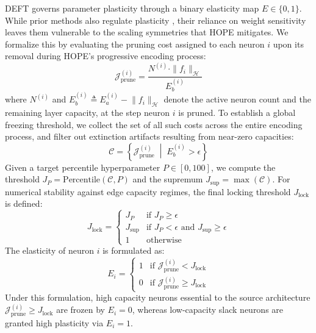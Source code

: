 \documentclass[11pt, a4paper, copyright, gdm]{google}
\newcommand{\normshort}[1]{\lVert#1\rVert}
\newcommand{\calC}{\mathcal{C}}
\newcommand{\calH}{\mathcal{H}}
\newcommand{\calJ}{\mathcal{J}}
\theoremstyle{definition}
\begin{document}
DEFT governs parameter plasticity through a binary elasticity map $E \in \{0,1\}$. While prior methods also regulate plasticity \cite{zhou2024taco}, their reliance on weight sensitivity leaves them vulnerable to the scaling symmetries that HOPE mitigates. We formalize this by evaluating the pruning cost assigned to each neuron $i$ upon its removal during HOPE's progressive encoding process:
\begin{equation}
    \calJ_{\text{prune}}^{(i)} = \frac{N^{(i)} \cdot \|f_i\|_{\calH}}{E_b^{(i)}}
\end{equation}
where $N^{(i)}$ and $E_b^{(i)} \triangleq E_a^{(i)} - \normshort{f_i}_{\calH}$ denote the active neuron count and the remaining layer capacity, at the step neuron $i$ is pruned. To establish a global freezing threshold, we collect the set of all such costs across the entire encoding process, and filter out extinction artifacts resulting from near-zero capacities:
\begin{equation}
    \calC = \left\{ \calJ_{\text{prune}}^{(i)} \;\middle|\; E_b^{(i)} > \epsilon \right\}
\end{equation}
Given a target percentile hyperparameter $P \in [0, 100]$, we compute the threshold $J_P = \text{Percentile}(\calC, P)$ and the supremum $J_{\sup} = \max(\calC)$. For numerical stability against edge capacity regimes, the final locking threshold $J_{\text{lock}}$ is defined:
\begin{equation}
    J_{\text{lock}} = 
    \begin{cases} 
        J_P & \text{if } J_P \ge \epsilon \\
        J_{\sup} & \text{if } J_P < \epsilon \text{ and } J_{\sup} \ge \epsilon \\
        1 & \text{otherwise}
    \end{cases}
\end{equation}
The elasticity of neuron $i$ is formulated as:
\begin{equation}
E_i = \begin{cases} 
1 & \text{if } \calJ_{\text{prune}}^{(i)} < J_{\text{lock}} \\
0 & \text{if } \calJ_{\text{prune}}^{(i)} \ge J_{\text{lock}}
\end{cases}
\end{equation}
Under this formulation, high capacity neurons essential to the source architecture $\calJ_{\text{prune}}^{(i)} \ge J_{\text{lock}}$ are frozen by $E_i=0$, whereas low-capacity slack neurons are granted high plasticity via $E_i=1$.
\end{document}
